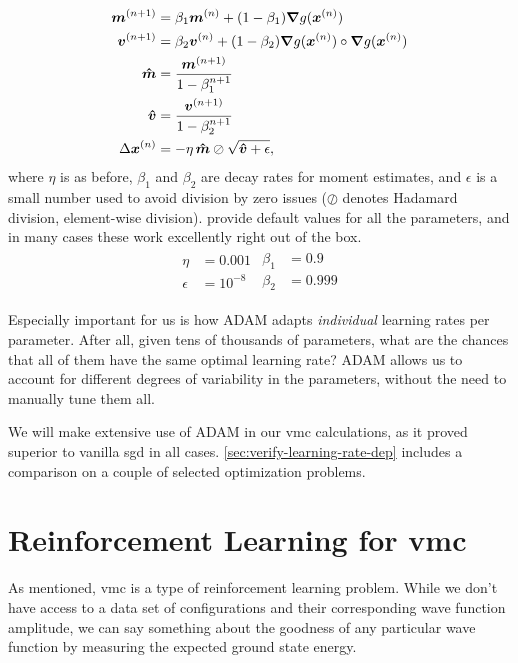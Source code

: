 \documentclass[Thesis.tex]{subfiles}
\begin{document}
\begin{align}
  \bm{m}^{(n+1)} &= \beta_1 \bm{m}^{(n)} + (1 - \beta_1)\grad{g(\bm{x}^{(n)})}\\
  \bm{v}^{(n+1)} &= \beta_2 \bm{v}^{(n)} + (1 - \beta_2)\grad{g(\bm{x}^{(n)})}\circ\grad{g(\bm{x}^{(n)})}\\
  \bm{\hat m} &= \frac{\bm{m}^{(n+1)}}{1 - \beta_1^{n+1}}\\
  \bm{\hat v} &= \frac{\bm{v}^{(n+1)}}{1 - \beta_2^{n+1}}\\
  \Delta \bm{x}^{(n)}&= -\eta\, \bm{\hat m}\oslash\sqrt{\bm{\hat v} + \epsilon},
\end{align}
where $\eta$ is as before, $\beta_1$ and $\beta_2$ are decay rates for moment
estimates, and $\epsilon$ is a small number used to avoid division by zero
issues ($\oslash$ denotes Hadamard division, element-wise division). \textcite{KingmaB14} provide default values for all the parameters, and
in many cases these work excellently right out of the box.
\begin{align}
  \label{eq:adam-default-parameters}
  \begin{split}
    \eta &= 0.001\\
    \epsilon &= 10^{-8}
  \end{split}
  \begin{split}
    \beta_1 &= 0.9\\
    \beta_2 &= 0.999
  \end{split}
\end{align}

Especially important for us is how ADAM adapts \emph{individual} learning rates
per parameter. After all, given tens of thousands of parameters, what are the
chances that all of them have the same optimal learning rate? ADAM allows us to
account for different degrees of variability in the parameters, without the need
to manually tune them all.

We will make extensive use of ADAM in our \gls{vmc} calculations, as it proved
superior to vanilla \gls{sgd} in all cases. \cref{sec:verify-learning-rate-dep}
includes a comparison on a couple of selected optimization problems.


\section{Reinforcement Learning for \Gls{vmc}}
\label{sec:reinf-learning-for-vmc}

As mentioned, \gls{vmc} is a type of reinforcement learning problem. While we don't
have access to a data set of configurations and their corresponding wave
function amplitude, we can say something about the goodness of any particular
wave function by measuring the expected ground state energy.
\end{document}
